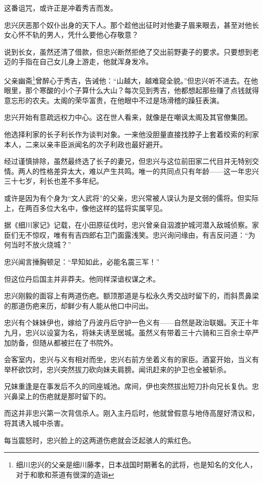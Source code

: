 \documentclass[
]{book}
\begin{document}
这番诅咒，或许正是冲着秀吉而发。

忠兴厌恶那个奴仆出身的天下人。那个趁他出征时对他妻子眉来眼去，甚至对他长女心怀不轨的男人，凭什么要他心存敬意？

说到长女，虽然还清了借款，但忠兴断然拒绝了交出前野妻子的要求。只要想到老迈的手指在自己女儿身上游走，他就浑身发冷。

父亲幽斋\footnote{细川忠兴的父亲是细川藤孝，日本战国时期著名的武将，也是知名的文化人，对于和歌和茶道有很深的造诣}曾醉心于秀吉，告诫他：``山越大，越难窥全貌。''但忠兴听不进去。在他眼里，那个寒酸的小个子算什么大山？每次见到秀吉，他都想起那些赚了点钱就得意忘形的农夫。太阁的荣华富贵，在他眼中不过是场滑稽的躁狂表演。

忠兴开始有意疏远权力中心。这在世人看来，就像是在嘲讽太阁及其官僚集团。

他选择利家的长子利长作为谈判对象。一来他没胆量直接找脖子上套着绞索的利家本人，二来以亲丰臣派闻名的次子利政也最好避开。

经过谨慎排除，虽然最终选了长子的妻兄，但忠兴与这位前田家二代目并无特别交情。两人的性格差异太大，难以产生共鸣。唯一的共同点只有年龄------这一年忠兴三十七岁，利长也差不多年纪。

或许是因为有个身为``文人武将''的父亲，忠兴常被人误认为是文弱的儒将。但实际上，在两百多位大名中，像他这样的猛将实属罕见。

据《细川家记》记载，在小田原征伐时，忠兴曾亲自泅渡护城河潜入敌城侦察。家臣们无不惊叹，唯有有吉四郎右卫门面露浅笑。忠兴询问缘由，有吉反问道：``为何当时不放火烧城？''

忠兴闻言捶胸顿足：``早知如此，必能名震三军！''

但这位丹后国主并非莽夫。他同样深谙权谋之术。

忠兴刚毅的面容上有两道伤疤。额顶那道是与松永久秀交战时留下的，而斜贯鼻梁的那道伤疤来历，却鲜少有人能从他口中问出。

忠兴有个妹妹伊也，嫁给了丹波丹后守护一色义有------自然是政治联姻。天正十年九月，忠兴以设宴为名，将妹夫诱至居城。虽然义有带着三十六骑和三百余士卒严加防备，但随从都被拦在了书院外。

会客室内，忠兴与义有相对而坐，忠兴右前方坐着义有的家臣。酒宴开始，当义有举杯欲饮时，忠兴突然拔刀砍向妹夫肩膀。闻讯赶来的护卫也全被斩杀。

兄妹重逢是在事发后不久的同座城池。席间，伊也突然拔出短刀扑向兄长复仇。忠兴鼻梁上的伤疤就是那时留下的。

而这并非忠兴第一次背信杀人。刚入主丹后时，他就曾假意与地侍高屋好清议和，将其诱入城中杀害。

每当震怒时，忠兴脸上的这两道伤疤就会泛起骇人的紫红色。
\end{document}
